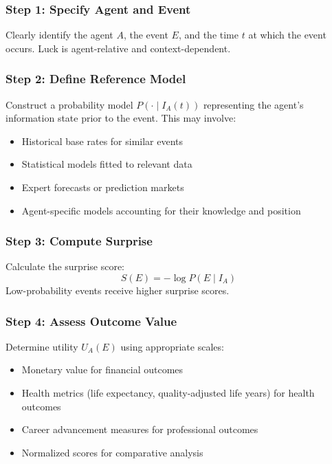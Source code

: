   \subsubsection{Step 1: Specify Agent and Event}

  Clearly identify the agent $A$, the event $E$, and the time $t$ at
  which the event occurs. Luck is agent-relative and context-dependent.

  \subsubsection{Step 2: Define Reference Model}

  Construct a probability model $P(\cdot \mid I_{A}(t))$ representing
  the agent's information state prior to the event. This may involve:
  \begin{itemize}
    \item Historical base rates for similar events

    \item Statistical models fitted to relevant data

    \item Expert forecasts or prediction markets

    \item Agent-specific models accounting for their knowledge and position
  \end{itemize}

  \subsubsection{Step 3: Compute Surprise}

  Calculate the surprise score:
  \begin{equation}
    S(E) = -\log P(E \mid I_{A})
  \end{equation}
  Low-probability events receive higher surprise scores.

  \subsubsection{Step 4: Assess Outcome Value}

  Determine utility $U_{A}(E)$ using appropriate scales:
  \begin{itemize}
    \item Monetary value for financial outcomes

    \item Health metrics (life expectancy, quality-adjusted life years)
      for health outcomes

    \item Career advancement measures for professional outcomes

    \item Normalized scores for comparative analysis
  \end{itemize}

